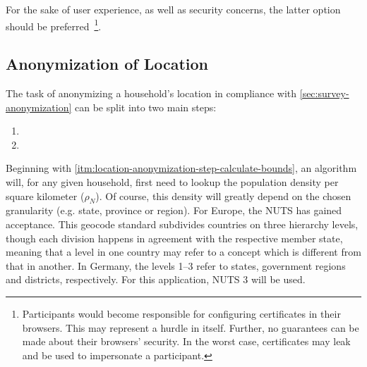 For the sake of user experience, as well as security concerns, the latter option should be preferred~\footnote{Participants would become responsible for configuring certificates in their browsers. This may represent a hurdle in itself. Further, no guarantees can be made about their browsers' security. In the worst case, certificates may leak and be used to impersonate a participant.}.


\subsection{Anonymization of Location}
\label{sec:anonymization-of-location-realization}

The task of anonymizing a household's location in compliance with \autoref{sec:survey-anonymization} can be split into two main steps:

\begin{enumerate}[label=(\Alph*)]
  \item {}
  \item {}
\end{enumerate}

Beginning with \ref{itm:location-anonymization-step-calculate-bounds}, an algorithm will, for any given household, first need to lookup the population density per square kilometer ($\rho_N$). Of course, this density will greatly depend on the chosen granularity (e.g. state, province or region). For Europe, the \ac{NUTS} has gained acceptance. This geocode standard subdivides countries on three hierarchy levels, though each division happens in agreement with the respective member state, meaning that a level in one country may refer to a concept which is different from that in another. In Germany, the levels 1--3 refer to states, government regions and districts, respectively. For this application, \ac{NUTS} 3 will be used.

